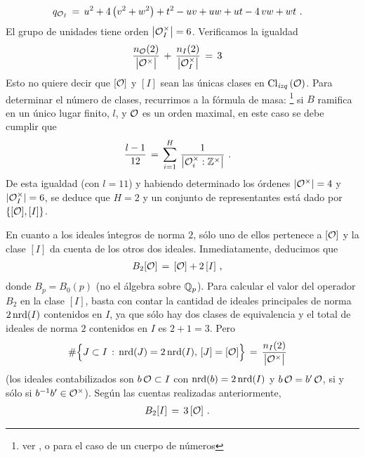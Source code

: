\begin{align*}
	q_{\cal{O}_{I}} %
	& \,=\,u^{2}+4\,\big(v^{2}+w^{2}\big)+t^{2}-uv+uw+ut-4\,vw+wt
	\text{ .}
\end{align*}
%
El grupo de unidades
tiene orden $\big|\cal{O}_{I}^{\times}\big|=6$. Verificamos la igualdad
\begin{align*}
	\frac{n_{\cal{O}}(2)}{\big|\cal{O}^{\times}\big|}
		\,+\,\frac{n_{I}(2)}{\big|\cal{O}_{I}^{\times}\big|}
		& \,=\,3
\end{align*}
%
Esto no quiere decir que $[\cal{O}]$ y $[I]$ sean las \'{u}nicas clases en
$\lClass{\cal{O}}$. Para determinar el n\'{u}mero de clases, recurrimos a la
f\'{o}rmula de masa:%
\footnote{
	ver \cite[Propo.~25]{PizerArithmeticII}, o \cite[\S~5]{KirschmerVoight}
	para el caso de un cuerpo de n\'{u}meros
}
si $B$ ramifica en un \'{u}nico lugar finito, $l$, y $\cal{O}$ es un
orden maximal, en este caso se debe cumplir que
\begin{align*}
	\frac{l-1}{12} & \,=\,\sum_{i=1}^{H}\,\frac{1}{%
		\big|\cal{O}_{i}^{\times}:\bb{Z}^{\times}\big|}
	\text{ .}
\end{align*}
%
De esta igualdad (con $l=11$) y habiendo determinado los \'{o}rdenes
$|\cal{O}^{\times}|=4$ y $|\cal{O}_{I}^{\times}|=6$, se deduce que $H=2$ y un
conjunto de representantes est\'{a} dado por $\{[\cal{O}],[I]\}$.

En cuanto a los ideales \'{\i}ntegros de norma $2$, s\'{o}lo uno de ellos
pertenece a $[\cal{O}]$ y la clase $[I]$ da cuenta de los otros dos ideales.
Inmediatamente, deducimos que
\begin{align*}
	B_{2}[\cal{O}] & \,=\,[\cal{O}]+2\,[I]
	\text{ ,}
\end{align*}
%
donde $B_p=B_{0}(p)$ (no el \'{a}lgebra sobre $\bb{Q}_{p}$). Para calcular el
valor del operador $B_2$ en la clase $[I]$, basta con contar la cantidad de
ideales principales de norma $2\,\nrd(I)$ contenidos en $I$, ya que s\'{o}lo
hay dos clases de equivalencia y el total de ideales de norma $2$ contenidos en $I$ es $2+1=3$. Pero
\begin{align*}
	\#\Big\{J\subset I\,:\,\nrd(J)=2\,\nrd(I),\, [J]=[\cal{O}]\Big\}
		& \,=\,	\frac{n_{I}(2)}{\big|\cal{O}^{\times}\big|}
\end{align*}
%
(los ideales contabilizados son $b\,\cal{O}\subset I$ con $\nrd(b)=2\,\nrd(I)$
y $b\,\cal{O}=b'\,\cal{O}$, si y s\'{o}lo si $b^{-1}b'\in\cal{O}^{\times}$).
Seg\'{u}n las cuentas realizadas anteriormente,
\begin{align*}
	B_{2}[I] & \,=\,3\,[\cal{O}]
	\text{ .}
\end{align*}
%

